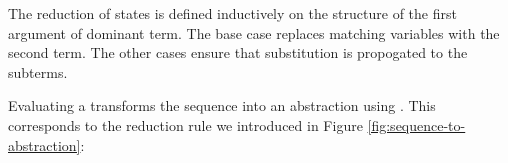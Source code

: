 The reduction of  states is defined inductively on the structure of the first argument of dominant term. The base case replaces matching variables with the second term. The other cases ensure that substitution is propogated to the subterms. 
\begin{comment}
eval (State (Sub e y x) d es q) = State e' d es q
  where e' = case e of
          Val (Var m) -> if m == x then y else (Val (Var m))
          Val (Abs h m) -> Val (Abs h (sub m y x))
          App m n -> App (sub m y x) (sub n y x)
          Val (Prompt p) -> Val (Prompt p)
          NewPrompt -> NewPrompt
          PushPrompt e1 e2 -> PushPrompt (sub e1 y x) (sub e2 y x)
          WithSubCont e1 e2 -> WithSubCont (sub e1 y x) (sub e2 y x)
          PushSubCont e1 e2 -> PushSubCont (sub e1 y x) (sub e2 y x)
\end{comment}
\begin{Shaded}
\begin{Highlighting}[]
 \NormalTok{(} \FunctionTok{=}  
   \FunctionTok{=}  
           \NormalTok{(} \OtherTok{->}  \FunctionTok{==}   \NormalTok{(} \NormalTok{(} 
           \NormalTok{(} \OtherTok{->}  \NormalTok{(} 
           \OtherTok{->}  
           \NormalTok{(} \OtherTok{->}  \NormalTok{(} 
           \OtherTok{->} 
           \OtherTok{->}  
           \OtherTok{->}  
           \OtherTok{->}  
\end{Highlighting}
\end{Shaded}

Evaluating a  transforms the sequence into an abstraction using . This corresponds to the reduction rule we introduced in Figure \ref{fig:sequence-to-abstraction}:
\begin{comment}
eval (State (Seq s) d es q) = State (seqToAbs s) d es q
\end{comment}
\begin{Shaded}
\begin{Highlighting}[]
 \NormalTok{(} \FunctionTok{=}  
\end{Highlighting}
\end{Shaded}


